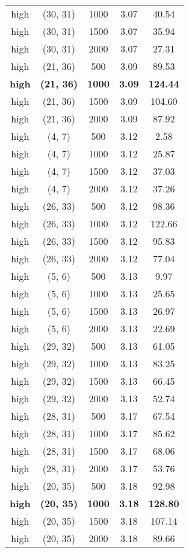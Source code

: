 \begin{tabular}{c c c c c}
high & (30, 31) &  1000 & 3.07 & 40.54 \\
high & (30, 31) &  1500 & 3.07 & 35.94 \\
high & (30, 31) &  2000 & 3.07 & 27.31 \\
high & (21, 36) &  500 & 3.09 & 89.53 \\
\textbf{high} & \textbf{(21, 36)} & \textbf{ 1000} & \textbf{3.09} & \textbf{124.44} \\
high & (21, 36) &  1500 & 3.09 & 104.60 \\
high & (21, 36) &  2000 & 3.09 & 87.92 \\
high & (4, 7) &  500 & 3.12 & 2.58 \\
high & (4, 7) &  1000 & 3.12 & 25.87 \\
high & (4, 7) &  1500 & 3.12 & 37.03 \\
high & (4, 7) &  2000 & 3.12 & 37.26 \\
high & (26, 33) &  500 & 3.12 & 98.36 \\
high & (26, 33) &  1000 & 3.12 & 122.66 \\
high & (26, 33) &  1500 & 3.12 & 95.83 \\
high & (26, 33) &  2000 & 3.12 & 77.04 \\
high & (5, 6) &  500 & 3.13 & 9.97 \\
high & (5, 6) &  1000 & 3.13 & 25.65 \\
high & (5, 6) &  1500 & 3.13 & 26.97 \\
high & (5, 6) &  2000 & 3.13 & 22.69 \\
high & (29, 32) &  500 & 3.13 & 61.05 \\
high & (29, 32) &  1000 & 3.13 & 83.25 \\
high & (29, 32) &  1500 & 3.13 & 66.45 \\
high & (29, 32) &  2000 & 3.13 & 52.74 \\
high & (28, 31) &  500 & 3.17 & 67.54 \\
high & (28, 31) &  1000 & 3.17 & 85.62 \\
high & (28, 31) &  1500 & 3.17 & 68.06 \\
high & (28, 31) &  2000 & 3.17 & 53.76 \\
high & (20, 35) &  500 & 3.18 & 92.98 \\
\textbf{high} & \textbf{(20, 35)} & \textbf{ 1000} & \textbf{3.18} & \textbf{128.80} \\
high & (20, 35) &  1500 & 3.18 & 107.14 \\
high & (20, 35) &  2000 & 3.18 & 89.66 \\

\end{tabular}
